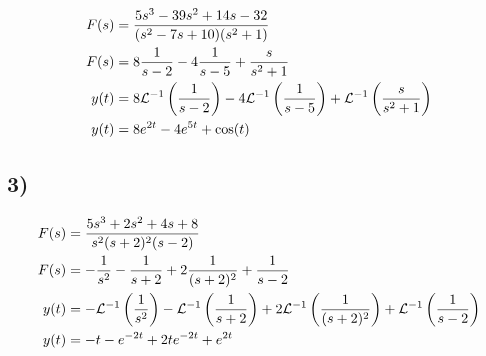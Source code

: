 \documentclass{article}
\begin{document}
\begin{align*}
	F(s) & = \frac{5s^3 - 39s^2 + 14s - 32}{(s^2 - 7s + 10)(s^2 + 1)} \\
	F(s) & = 8\frac{1}{s - 2} - 4\frac{1}{s - 5} + \frac{s}{s^2 + 1} \\
	y(t) & = 8\mathcal{L}^{-1} \left( \frac{1}{s - 2} \right) - 4\mathcal{L}^{-1} \left( \frac{1}{s - 5} \right) + \mathcal{L}^{-1} \left( \frac{s}{s^2 + 1} \right) \\
	y(t) & = 8e^{2t} - 4e^{5t} + \cos(t)
\end{align*}

\subsection{3)}

\begin{align*}
	F(s) & = \frac{5s^3 + 2s^2 + 4s + 8}{s^2(s + 2)^2(s - 2)} \\
	F(s) & = -\frac{1}{s^2} - \frac{1}{s + 2} + 2\frac{1}{(s + 2)^2} + \frac{1}{s - 2} \\
	y(t) & = -\mathcal{L}^{-1} \left( \frac{1}{s^2} \right) - \mathcal{L}^{-1} \left( \frac{1}{s + 2} \right) + 2\mathcal{L}^{-1} \left( \frac{1}{(s + 2)^2} \right) + \mathcal{L}^{-1} \left( \frac{1}{s - 2} \right) \\
	y(t) & = -t - e^{-2t} + 2te^{-2t} + e^{2t}
\end{align*}
\end{document}
